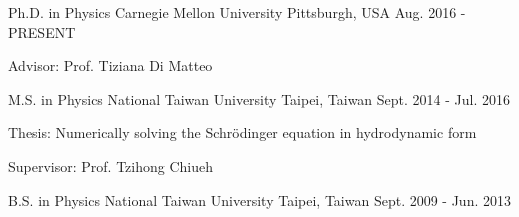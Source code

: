 


\begin{cventries}


\cventry
{Ph.D. in Physics} %
{Carnegie Mellon University} %
{Pittsburgh, USA} %
{Aug. 2016 - PRESENT} %
{ %
\begin{cvitems}
\item {Advisor: Prof. Tiziana Di Matteo}
\end{cvitems}
}

\vspace{-6mm}

\cventry
{M.S. in Physics} %
{National Taiwan University} %
{Taipei, Taiwan} %
{Sept. 2014 - Jul. 2016} %
{ %
\begin{cvitems}
\item {Thesis: Numerically solving the Schrödinger equation in hydrodynamic form}
\item {Supervisor: Prof. Tzihong Chiueh }
\end{cvitems}
}

\vspace{-6mm}

\cventry
{B.S. in Physics} %
{National Taiwan University} %
{Taipei, Taiwan} %
{Sept. 2009 - Jun. 2013} %
{%
}



\end{cventries}